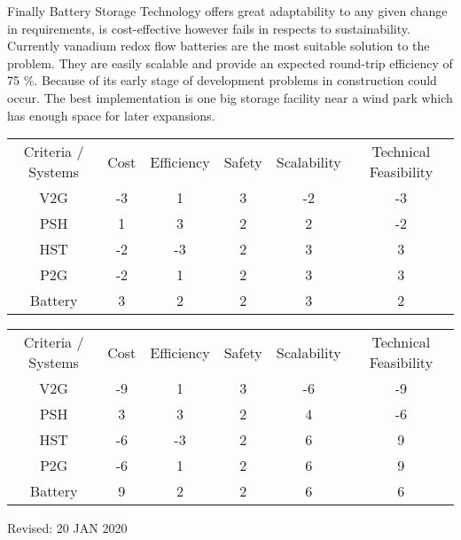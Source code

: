 \begin{parcolumns}[colwidths={1=2.5 cm, 2=10 cm, 3=2.5cm}]{3}
{\noindent
Finally Battery Storage Technology offers great adaptability to any given change in requirements, is cost-effective however fails in respects to sustainability. Currently vanadium redox flow batteries are the most suitable solution to the problem. They are easily scalable and provide an expected round-trip efficiency of 75 $\%$. Because of its early stage of development problems in construction could occur. The best implementation is one big storage facility near a wind park which has enough space for later expansions. \\ 
}

\end{parcolumns}

\begin{table} 
\centering 
\begin{tabular}{cccccc}
Criteria / Systems & Cost & Efficiency & Safety & Scalability & Technical Feasibility \\ 
V2G & -3 & 1 & 3 & -2 & -3 \\
PSH & 1 & 3 & 2 & 2 & -2 \\
HST & -2 & -3 & 2 & 3 & 3 \\
P2G & -2 & 1 & 2 & 3 & 3 \\
Battery & 3 & 2 & 2 & 3 & 2 \\
\end{tabular}
\begin{tabular}{cccccc}
Criteria / Systems & Cost & Efficiency & Safety & Scalability & Technical Feasibility \\ 
V2G & -9 & 1 & 3 & -6 & -9 \\
PSH & 3 & 3 & 2 & 4 & -6 \\
HST & -6 & -3 & 2 & 6 & 9 \\
P2G & -6 & 1 & 2 & 6 & 9 \\
Battery & 9 & 2 & 2 & 6 & 6 \\
\end{tabular}
\end{table}
\begin{parcolumns}[colwidths={1=2.5 cm, 2=10 cm, 3=2.5cm}]{3}

\end{parcolumns}
\begin{flushright}
Revised: 20 JAN 2020
\end{flushright}
\clearpage
